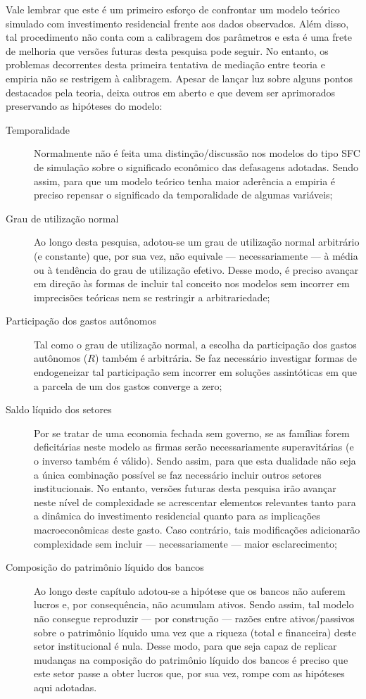 Vale lembrar que este é um primeiro esforço de confrontar um modelo teórico simulado com investimento residencial frente aos dados observados.
Além disso, tal procedimento não conta com a calibragem dos parâmetros e esta é uma frete de melhoria que versões futuras desta pesquisa pode seguir.
No entanto, os problemas decorrentes desta primeira tentativa de mediação entre teoria e empiria não se restrigem à calibragem. 
Apesar de lançar luz sobre alguns pontos destacados pela teoria, deixa outros em aberto e que devem ser aprimorados preservando as hipóteses do modelo:
\begin{description}
	\item[Temporalidade] Normalmente não é feita uma distinção/discussão nos modelos do tipo SFC de simulação sobre o significado econômico das defasagens adotadas. Sendo assim, para que um modelo teórico tenha maior aderência a empiria é preciso repensar o significado da temporalidade de algumas variáveis;
	\item[Grau de utilização normal] Ao longo desta pesquisa, adotou-se um grau de utilização normal arbitrário (e constante) que, por sua vez, não equivale --- necessariamente --- à média ou à tendência do grau de utilização efetivo. Desse modo, é preciso avançar em direção às formas de incluir tal conceito nos modelos sem incorrer em imprecisões teóricas nem se restringir a arbitrariedade;
	\item[Participação dos gastos autônomos] Tal como o grau de utilização normal, a escolha da participação dos gastos autônomos ($R$) também é arbitrária. Se faz necessário investigar formas de endogeneizar tal participação sem incorrer em soluções assintóticas em que a parcela de um dos gastos converge a zero;
	\item[Saldo líquido dos setores] Por se tratar de uma economia fechada sem governo, se as famílias forem deficitárias neste modelo as firmas serão necessariamente superavitárias (e o inverso também é válido).
	Sendo assim, para que esta dualidade não seja a única combinação possível se faz necessário incluir outros setores institucionais. No entanto, versões futuras desta pesquisa irão avançar neste nível de complexidade se acrescentar elementos relevantes tanto para a dinâmica do investimento residencial quanto para as implicações macroeconômicas deste gasto. Caso contrário, tais modificações adicionarão complexidade sem incluir --- necessariamente --- maior esclarecimento;
	\item[Composição do patrimônio líquido dos bancos] Ao longo deste capítulo adotou-se a hipótese que os bancos não auferem lucros e, por consequência, não acumulam ativos.
	Sendo assim, tal modelo não consegue reproduzir --- por construção --- razões entre ativos/passivos sobre o patrimônio líquido uma vez que a riqueza (total e financeira) deste setor institucional é nula.
	Desse modo, para que seja capaz de replicar mudanças na composição do patrimônio líquido dos bancos é preciso que este setor passe a obter lucros que, por sua vez, rompe com as hipóteses aqui adotadas.
\end{description}

